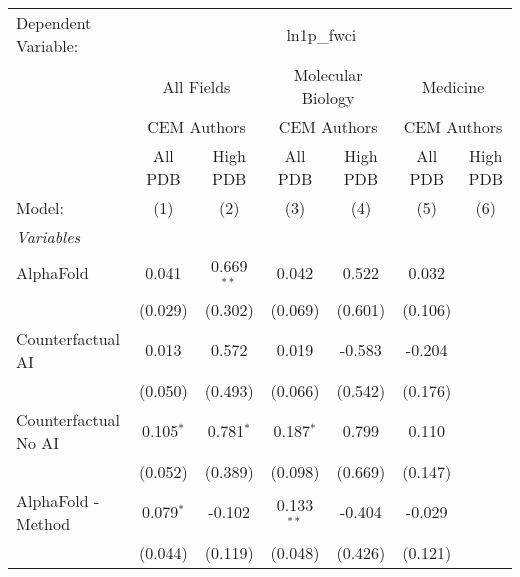 \begingroup
\centering
\begin{tabular}{lcccccc}
   \tabularnewline \midrule \midrule
   Dependent Variable: & \multicolumn{6}{c}{ln1p\_fwci}\\
 & \multicolumn{2}{c}{All Fields} & \multicolumn{2}{c}{Molecular Biology} & \multicolumn{2}{c}{Medicine} \\
\cmidrule(lr){2-3} \cmidrule(lr){4-5} \cmidrule(lr){6-7}
 & \multicolumn{2}{c}{CEM Authors} & \multicolumn{2}{c}{CEM Authors} & \multicolumn{2}{c}{CEM Authors} \\
\cmidrule(lr){2-3} \cmidrule(lr){4-5} \cmidrule(lr){6-7}
 & \multicolumn{1}{c}{All PDB} & \multicolumn{1}{c}{High PDB} & \multicolumn{1}{c}{All PDB} & \multicolumn{1}{c}{High PDB} & \multicolumn{1}{c}{All PDB} & \multicolumn{1}{c}{High PDB} \\
\cmidrule(lr){2-2} \cmidrule(lr){3-3} \cmidrule(lr){4-4} \cmidrule(lr){5-5} \cmidrule(lr){6-6} \cmidrule(lr){7-7}
   Model:                                                     & (1)            & (2)           & (3)           & (4)     & (5)          & (6)\\  
   \midrule
   \emph{Variables}\\
   AlphaFold                                                  & 0.041          & 0.669$^{**}$  & 0.042         & 0.522   & 0.032        &   \\   
                                                              & (0.029)        & (0.302)       & (0.069)       & (0.601) & (0.106)      &   \\   
   Counterfactual AI                                          & 0.013          & 0.572         & 0.019         & -0.583  & -0.204       &   \\   
                                                              & (0.050)        & (0.493)       & (0.066)       & (0.542) & (0.176)      &   \\   
   Counterfactual No AI                                       & 0.105$^{*}$    & 0.781$^{*}$   & 0.187$^{*}$   & 0.799   & 0.110        &   \\   
                                                              & (0.052)        & (0.389)       & (0.098)       & (0.669) & (0.147)      &   \\   
   AlphaFold - Method                                         & 0.079$^{*}$    & -0.102        & 0.133$^{**}$  & -0.404  & -0.029       &   \\   
                                                              & (0.044)        & (0.119)       & (0.048)       & (0.426) & (0.121)      &   \\   

\end{tabular}
